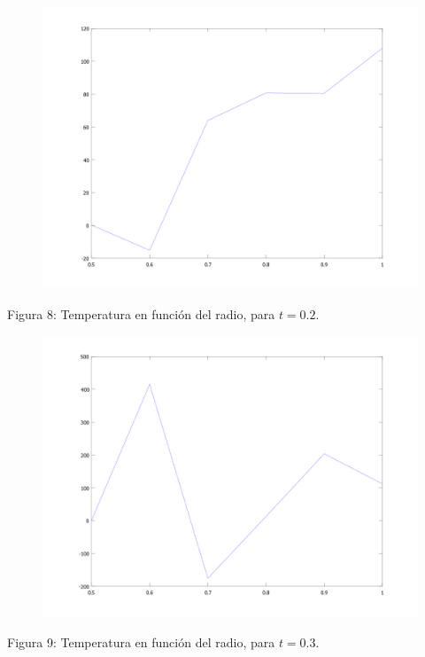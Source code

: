 ﻿\documentclass[%
final,
%
reprint,
%
notitlepage,
narroweqnarray,
inline,
twoside,
invited
]{ieee}
\begin{document}
\begin{figure}[H]
	\begin{center}
	\includegraphics[scale=0.2]{./img/div3.png}
	\end{center}
\end{figure}
\begin{center}
\par Figura 8: Temperatura en función del radio, para $t=0.2$.
\end{center}

\begin{figure}[H]
	\begin{center}
	\includegraphics[scale=0.2]{./img/div4.png}
	\end{center}
\end{figure}
\begin{center}
\par Figura 9: Temperatura en función del radio, para $t=0.3$.
\end{center}
\end{document}
